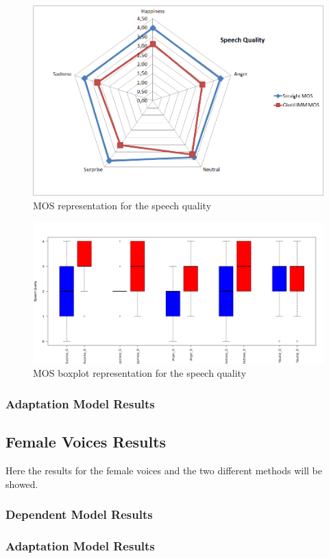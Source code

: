 \begin{figure}[!htb]
	\begin{center}
	\includegraphics[width=1\textwidth]{results/Vocoders1_joa_MOS.png}
	\end{center}
	\caption{\label{joa2-ES-1}MOS representation for the speech quality}
\end{figure}
\begin{figure}[!htb]
	\begin{center}
	\includegraphics[width=1\textwidth]{results/Vocoders1_joa_MOS_boxplot.png}
	\end{center}
	\caption{\label{joa2-MOS-1}MOS boxplot representation for the speech quality}
\end{figure}
\subsubsection{Adaptation Model Results}\label{madaptresults}
\subsection{Female Voices Results}\label{femaleres}
Here the results for the female voices and the two different methods will be showed.\\
\subsubsection{Dependent Model Results}\label{fdpmresults}
\subsubsection{Adaptation Model Results}\label{fadaptresults}